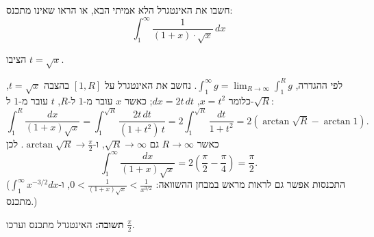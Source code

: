 
\begin{question}
חשבו את האינטגרל הלא אמיתי הבא, או הראו שאינו מתכנס:
\[ \int_1^\infty \frac{1}{(1+x)\cdot\sqrt{x}}\,dx \]
\end{question}

\begin{hint}
הציבו $t = \sqrt{x}$.
\end{hint}

\begin{solution}
לפי ההגדרה, $\int_1^\infty g = \lim_{R\to\infty}\int_1^R g$. נחשב את האינטגרל על $[1,R]$ בהצבה $t = \sqrt{x}$, כלומר $x = t^2$, $dx = 2t\,dt$; כאשר $x$ עובר מ-$1$ ל-$R$, $t$ עובר מ-$1$ ל-$\sqrt R$:
\[ \int_1^R \frac{dx}{(1+x)\sqrt{x}} = \int_1^{\sqrt R}\frac{2t\,dt}{(1+t^2)\,t} = 2\int_1^{\sqrt R}\frac{dt}{1+t^2} = 2\left(\arctan\sqrt R - \arctan 1\right). \]
כאשר $R \to \infty$ גם $\sqrt R \to \infty$, ו-$\arctan\sqrt R \to \frac\pi2$. לכן
\[ \int_1^\infty \frac{dx}{(1+x)\sqrt{x}} = 2\left(\frac\pi2 - \frac\pi4\right) = \frac{\pi}{2}. \]
(התכנסות אפשר גם לראות מראש במבחן ההשוואה: $0 < \frac{1}{(1+x)\sqrt x} < \frac{1}{x^{3/2}}$, ו-$\int_1^\infty x^{-3/2}dx$ מתכנס.)

\textbf{תשובה:} האינטגרל מתכנס וערכו $\frac{\pi}{2}$.
\end{solution}
